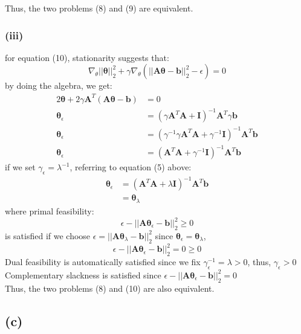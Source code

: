 \documentclass[11pt]{article}
\begin{document}
\noindent Thus, the two problems (8) and (9) are equivalent.
\subsubsection*{(iii)}
for equation (10), stationarity suggests that:
\begin{equation}
\nabla_\theta||\pmb{\theta}||^2_2+\gamma\nabla_\theta(||\pmb{A\theta}-\pmb{b}||^2_2-\epsilon)=0
\end{equation}
by doing the algebra, we get:
\begin{equation}
\begin{split}
2\pmb{\theta}+2\gamma\pmb{A}^T(\pmb{A\theta}-\pmb{b})&=0\\
\pmb{\theta}_\epsilon&=(\gamma\pmb{A}^T\pmb{A}+\pmb{I})^{-1}\pmb{A}^T\gamma\pmb{b}\\
\pmb{\theta}_\epsilon&=(\gamma^{-1}\gamma\pmb{A}^T\pmb{A}+\gamma^{-1}\pmb{I})^{-1}\pmb{A}^T\pmb{b}\\
\pmb{\theta}_\epsilon&=(\pmb{A}^T\pmb{A}+\gamma^{-1}\pmb{I})^{-1}\pmb{A}^T\pmb{b}
\end{split}
\end{equation}
if we set $\gamma_\epsilon=\lambda^{-1}$, referring to equation (5) above:\\
\begin{equation}
\begin{split}
\pmb{\theta}_\epsilon&=(\pmb{A}^T\pmb{A}+\lambda\pmb{I})^{-1}\pmb{A}^T\pmb{b}\\
&=\pmb{\theta}_\lambda
\end{split}
\end{equation}
where primal feasibility:
$$\epsilon-||\pmb{A\theta}_\epsilon-\pmb{b}||^2_2\ge 0$$
is satisfied if we choose $\epsilon = ||\pmb{A\theta}_\lambda-\pmb{b}||^2_2$ since $\pmb{\theta}_\epsilon = \pmb{\theta}_\lambda$,\\
$$\epsilon-||\pmb{A\theta}_\epsilon-\pmb{b}||^2_2=0\ge0$$
Dual feasibility is automatically satisfied since we fix $\gamma_\epsilon^{-1}=\lambda>0$, thus, $
\gamma_\epsilon > 0$\\
Complementary slackness is satisfied since 	$\epsilon-||\pmb{A\theta}_\epsilon-\pmb{b}||^2_2=0$\\

\noindent Thus, the two problems (8) and (10) are also equivalent.
\pagebreak
\subsection*{(c)}
\end{document}
